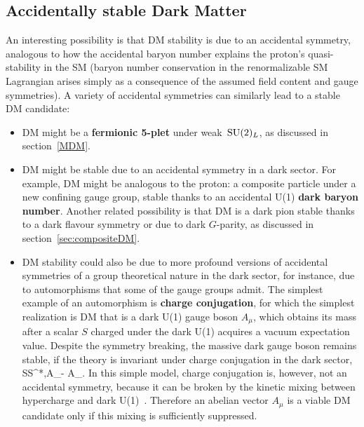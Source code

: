 \subsection{Accidentally stable Dark Matter}\label{sec:accidentallystable}
An interesting possibility is that DM stability is due to an accidental symmetry,
analogous to how the accidental baryon number explains the proton's quasi-stability in the SM 
(baryon number conservation in the renormalizable SM Lagrangian arises simply as a consequence of the assumed field content and gauge symmetries).
A variety of accidental symmetries can similarly lead to a stable DM candidate:
\begin{itemize}
\item[$\blacktriangleright$] DM might be a {\bf fermionic 5-plet} under weak $\,{\rm SU}(2)_L$, as discussed in section~\ref{MDM}. 

\item[$\blacktriangleright$] 
DM might be stable due to an accidental symmetry in a dark sector.
For example, DM might be analogous to the proton:
a composite particle under a new confining gauge group,
stable thanks to an accidental U(1) {\bf dark baryon number}. 
Another related possibility is that DM is a dark pion stable thanks to a dark flavour symmetry or due to dark $G$-parity,
as discussed in section~\ref{sec:compositeDM}.


 \item[$\blacktriangleright$] 
 DM stability could also be due to more profound versions of accidental symmetries of a group theoretical nature in the dark sector, for instance, due to automorphisms
that some of the gauge groups admit.
The simplest example of an automorphism is  {\bf charge conjugation}, for which the simplest realization 
is DM that is a dark U(1) gauge boson $A_\mu$, 
 which obtains its mass after a  scalar $S$ charged under the dark U(1) acquires a vacuum expectation value.
Despite the symmetry breaking, the massive dark gauge boson remains stable, 
if the theory is invariant under charge conjugation in the dark sector, 
\beq S\to S^*,\qquad A_\mu\to - A_\mu.\eeq
In this simple model, charge conjugation  is, however, not an accidental symmetry, because it
can be broken by the kinetic mixing between hypercharge and dark U(1)~\cite{VectorDM}.
Therefore an abelian vector $A_\mu$ is a viable DM candidate only if this mixing is sufficiently suppressed.


\end{itemize}
